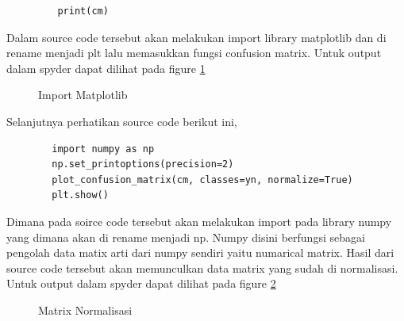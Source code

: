 \begin{enumerate}
\begin{verbatim}
   		 print(cm)
	\end{verbatim}

Dalam source code tersebut akan melakukan import library matplotlib dan di rename menjadi plt lalu memasukkan fungsi confusion matrix. Untuk output dalam spyder dapat dilihat pada figure \ref{YNC4-20}

	\begin{figure}[ht]
		\caption{Import Matplotlib}
		\label{YNC4-20}
	\end{figure}

Selanjutnya perhatikan source code berikut ini,

	\begin{verbatim}
		import numpy as np
		np.set_printoptions(precision=2)
		plot_confusion_matrix(cm, classes=yn, normalize=True)
		plt.show()
	\end{verbatim}

Dimana pada soirce code tersebut akan melakukan import pada library numpy yang dimana akan di rename menjadi np. Numpy disini berfungsi sebagai pengolah data matix arti dari numpy sendiri yaitu numarical matrix. Hasil dari source code tersebut akan memunculkan data matrix yang sudah di normalisasi. Untuk output dalam spyder dapat dilihat pada figure \ref{YNC4-21}

	\begin{figure}[ht]
		\caption{Matrix Normalisasi}
		\label{YNC4-21}
	\end{figure}


\end{enumerate}
